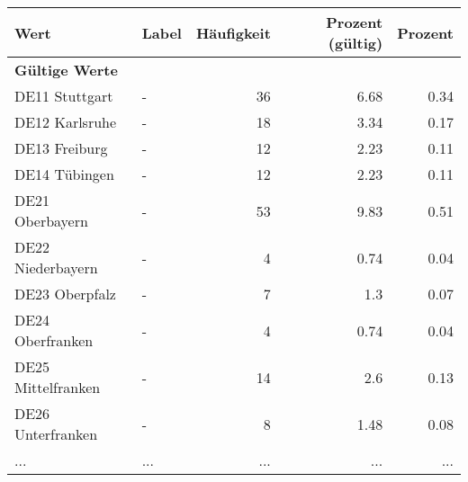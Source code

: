      \begin{longtable}{Xlrrr}
     \toprule
     \textbf{Wert} & \textbf{Label} & \textbf{Häufigkeit} & \textbf{Prozent (gültig)} & \textbf{Prozent} \\
     \endhead
     \midrule
     \multicolumn{5}{l}{\textbf{Gültige Werte}}\\
        \multicolumn{1}{X}{DE11 Stuttgart} & - & \num{36} & \num[round-mode=places,round-precision=2]{6.68} & \num[round-mode=places,round-precision=2]{0.34} \\
        \multicolumn{1}{X}{DE12 Karlsruhe} & - & \num{18} & \num[round-mode=places,round-precision=2]{3.34} & \num[round-mode=places,round-precision=2]{0.17} \\
        \multicolumn{1}{X}{DE13 Freiburg} & - & \num{12} & \num[round-mode=places,round-precision=2]{2.23} & \num[round-mode=places,round-precision=2]{0.11} \\
        \multicolumn{1}{X}{DE14 Tübingen} & - & \num{12} & \num[round-mode=places,round-precision=2]{2.23} & \num[round-mode=places,round-precision=2]{0.11} \\
        \multicolumn{1}{X}{DE21 Oberbayern} & - & \num{53} & \num[round-mode=places,round-precision=2]{9.83} & \num[round-mode=places,round-precision=2]{0.51} \\
        \multicolumn{1}{X}{DE22 Niederbayern} & - & \num{4} & \num[round-mode=places,round-precision=2]{0.74} & \num[round-mode=places,round-precision=2]{0.04} \\
        \multicolumn{1}{X}{DE23 Oberpfalz} & - & \num{7} & \num[round-mode=places,round-precision=2]{1.3} & \num[round-mode=places,round-precision=2]{0.07} \\
        \multicolumn{1}{X}{DE24 Oberfranken} & - & \num{4} & \num[round-mode=places,round-precision=2]{0.74} & \num[round-mode=places,round-precision=2]{0.04} \\
        \multicolumn{1}{X}{DE25 Mittelfranken} & - & \num{14} & \num[round-mode=places,round-precision=2]{2.6} & \num[round-mode=places,round-precision=2]{0.13} \\
        \multicolumn{1}{X}{DE26 Unterfranken} & - & \num{8} & \num[round-mode=places,round-precision=2]{1.48} & \num[round-mode=places,round-precision=2]{0.08} \\
       ... & ... & ... & ... & ... \\

\end{longtable}
